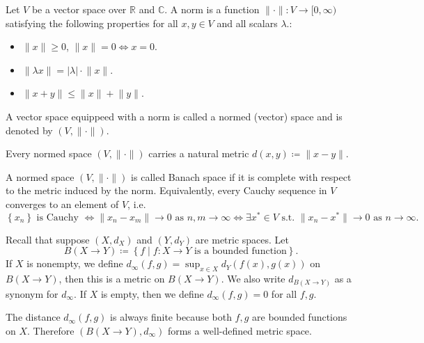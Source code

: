 \begin{definition}
    Let \(V\) be a vector space over \(\mathbb{R}\) and \(\mathbb{C}\). A norm is a function \(\lVert \cdot \rVert: V \to [0, \infty) \) satisfying the following properties for all \(x, y \in V\) and all scalars \(\lambda\).:
    \begin{itemize}
        \item [(1)] \(\lVert x \rVert \ge 0 \), \(\lVert x \rVert = 0 \iff x = 0 \). 
        \item [(2)] \(\lVert \lambda x \rVert = \vert \lambda \vert \cdot \lVert x \rVert   \). 
        \item [(3)] \(\lVert x + y \rVert \le \lVert x \rVert + \lVert y \rVert   \).
    \end{itemize}      
    A vector space equippeed with a norm is called a normed (vector) space and is denoted by \((V, \lVert \cdot \rVert )\). 
\end{definition}

\begin{remark}
    Every normed space \((V, \lVert \cdot \rVert )\) carries a natural metric \(d(x, y) \coloneqq \lVert x - y \rVert \).  
\end{remark}

\begin{definition}
    A normed space \((V, \lVert \cdot \rVert )\) is called Banach space if it is complete with respect to the metric induced by the norm. Equivalently, every Cauchy sequence in \(V\) converges to an element of \(V\), i.e. 
    \[
        \left\{ x_n \right\} \text{ is Cauchy } \iff \lVert x_n - x_m \rVert \to 0 \text{ as } n, m \to \infty \iff \exists x^* \in V \text{ s.t. }  \lVert x_n - x^* \rVert \to 0 \text{ as } n \to \infty.  
    \]   
\end{definition}

Recall that suppose \((X, d_X)\) and \((Y, d_Y)\) are metric spaces. Let
\[
    B(X \to Y) \coloneqq \left\{ f \mid f:X \to Y \text{ is a bounded function}  \right\}. 
\]
If \(X\) is nonempty, we define \(d_{\infty }(f, g) = \sup _{x \in X} d_Y(f(x), g(x))\) on \(B(X \to Y)\), then this is a metric on \(B(X \to Y)\). We also write \(d_{B(X \to Y)}\) as a synonym for \(d_{\infty}\). If \(X\) is empty, then we define \(d_{\infty }(f, g) = 0\) for all \(f, g\).

\begin{observation}
    The distance \(d_{\infty } (f, g)\) is always finite because both \(f, g\) are bounded functions on \(X\). Therefore \((B(X \to Y), d_{\infty })\) forms a well-defined metric space.    
\end{observation}

